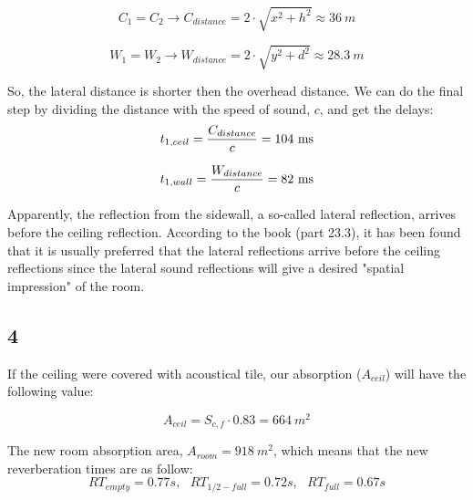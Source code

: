 \documentclass{article}
\begin{document}
\begin{equation}
    C_1=C_2 \rightarrow C_{distance} = 2 \cdot \sqrt{x^2+h^2} \approx 36 \ m
\end{equation}

\begin{equation}
    W_1=W_2 \rightarrow W_{distance} = 2 \cdot \sqrt{y^2+d^2} \approx 28.3 \ m
\end{equation}

So, the lateral distance is shorter then the overhead distance. We can do the final step by dividing the distance with the speed of sound, $c$, and get the delays: 
\begin{equation}
  t_{1,ceil} = \frac{C_{distance}}{c} = 104\ {\rm ms}
\end{equation}

\begin{equation}
  t_{1,wall} = \frac{W_{distance}}{c} = 82\ {\rm ms}
\end{equation}

Apparently, the reflection from the sidewall, a so-called lateral reflection, arrives before the ceiling reflection. According to the book (part 23.3), it has been found that it is usually preferred that the lateral reflections arrive before the ceiling reflections since the lateral sound reflections will give a desired "spatial impression" of the room.


\subsection*{4}
If the ceiling were covered with acoustical tile, our absorption ($A_{ceil}$) will have the following value:

\begin{equation}
    A_{ceil} = S_{c,f} \cdot 0.83 = 664 \ m^2
\end{equation}

The new room absorption area, $A_{room}=918\ m^2$, which means that the new reverberation times are as follow: 
\begin{equation}
RT_{empty}=0.77 s, \ \ \   
RT_{1/2-full}=0.72 s, \ \ \ 
RT_{full}= 0.67 s
\end{equation}
\end{document}
